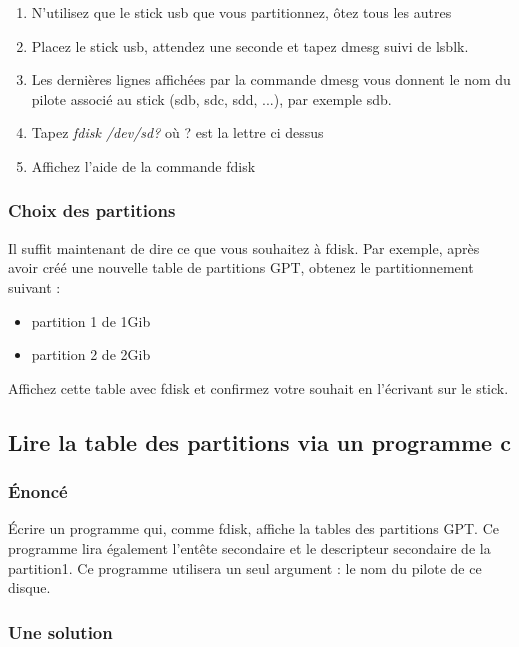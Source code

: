 \begin{enumerate}
\item N'utilisez que le stick usb que vous partitionnez, ôtez tous les autres
\item Placez le stick usb, attendez une seconde et tapez dmesg suivi de lsblk.
\item Les dernières lignes affichées par la commande dmesg vous donnent le nom du pilote associé au stick (sdb, sdc, sdd, ...), par exemple sdb.
\item Tapez \emph{fdisk /dev/sd?} où ? est la lettre ci dessus
\item Affichez l'aide de la commande fdisk
\end{enumerate}

\subsubsection{Choix des partitions}

Il suffit maintenant de dire ce que vous souhaitez à fdisk. Par exemple, après avoir créé une nouvelle table de partitions GPT, obtenez le partitionnement suivant :

\begin{itemize}
\item partition 1 de 1Gib
\item partition 2 de 2Gib
\end{itemize}

Affichez cette table avec fdisk et confirmez votre souhait en l'écrivant sur le stick.

\subsection{Lire la table des partitions via un programme c}

\subsubsection{Énoncé}

Écrire un programme qui, comme fdisk, affiche la tables des partitions GPT. Ce programme lira également l'entête secondaire et le descripteur secondaire de la partition1. Ce programme utilisera un seul argument : le nom du pilote de ce disque.
\subsubsection{Une solution}



